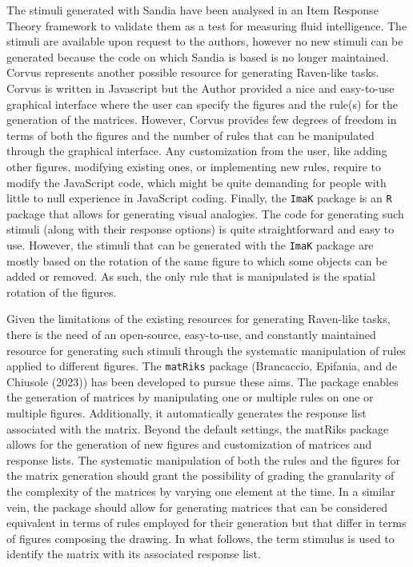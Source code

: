 The stimuli generated with Sandia have been analysed in an Item Response Theory framework to validate them as a test for measuring fluid intelligence.
The stimuli are available upon request to the authors, however no new stimuli can be generated because the code on which Sandia is based is no longer maintained.
Corvus represents another possible resource for generating Raven-like tasks. Corvus is written in Javascript but the Author provided a nice and easy-to-use graphical interface where the user can specify the figures and the rule(s) for the generation of the matrices. However, Corvus provides few degrees of freedom in terms of both the figures and the number of rules that can be manipulated through the graphical interface. Any customization from the user, like adding other figures, modifying existing ones, or implementing new rules, require to modify the JavaScript code, which might be quite demanding for people with little to null experience in JavaScript coding.
Finally, the \texttt{ImaK} package is an \texttt{R} package that allows for generating visual analogies. The code for generating such stimuli (along with their response options) is quite straightforward and easy to use. However, the stimuli that can be generated with the \texttt{ImaK} package are mostly based on the rotation of the same figure to which some objects can be added or removed. As such, the only rule that is manipulated is the spatial rotation of the figures.

Given the limitations of the existing resources for generating Raven-like tasks, there is the need of an open-source, easy-to-use, and constantly maintained resource for generating such stimuli through the systematic manipulation of rules applied to different figures.
The \texttt{matRiks} package (Brancaccio, Epifania, and de Chiusole (2023)) has been developed to pursue these aims.
The package enables the generation of matrices by manipulating one or multiple rules on one or multiple figures. Additionally, it automatically generates the response list associated with the matrix. Beyond the default settings, the matRiks package allows for the generation of new figures and customization of matrices and response lists.
The systematic manipulation of both the rules and the figures for the matrix generation should grant the possibility of grading the granularity of the complexity of the matrices by varying one element at the time.
In a similar vein, the package should allow for generating matrices that can be considered equivalent in terms of rules employed for their generation but that differ in terms of figures composing the drawing. In what follows, the term stimulus is used to identify the matrix with its associated response list.

